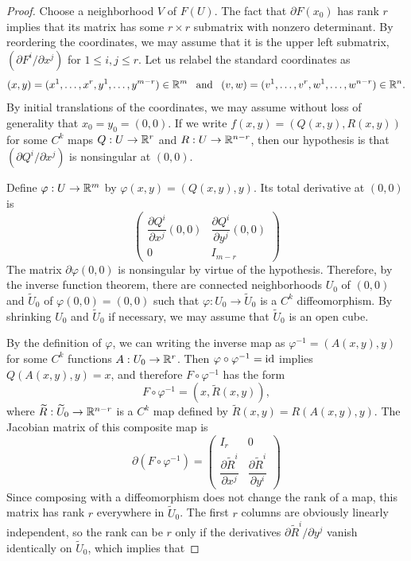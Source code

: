 \begin{proof}
Choose a neighborhood $V$ of $F(U)$. The fact that $\partial F(x_0)$ has rank $r$ implies that its matrix has some $r\times r$ submatrix with nonzero determinant. By reordering the coordinates, we may assume that it is the upper left submatrix, $(\partial F^i/\partial x^j)$ for $1\leq i,j\leq r$. Let us relabel the standard coordinates as 
\[(x,y)=(x^1,\dots,x^r,y^1,\dots,y^{m-r})\in\mathbb{R}^m \hspace{8pt}\text{and}\hspace{8pt}(v,w)=(v^1,\dots,v^r,w^1,\dots,w^{n-r})\in\mathbb{R}^n.\] 
By initial translations of the coordinates, we may assume without loss of generality that $x_0=y_0=(0,0)$. If we write $f(x,y)=(Q(x,y),R(x,y))$ for some $C^k$ maps 
$Q:U\to\mathbb{R}^r$ and $R:U\to\mathbb{R}^{n-r}$, then our hypothesis is that $(\partial Q^i/\partial x^j)$ is nonsingular at $(0,0)$.\par
Define $\varphi:U\to\mathbb{R}^m$ by $\varphi(x,y)=(Q(x,y),y)$. Its total derivative at $(0,0)$ is
\[\begin{pmatrix}
\dfrac{\partial Q^i}{\partial x^j}(0,0)&\dfrac{\partial Q^i}{\partial y^j}(0,0)\\[8pt]
0&I_{m-r}
\end{pmatrix}\]
The matrix $\partial\varphi(0,0)$ is nonsingular by virtue of the hypothesis. Therefore, by the inverse function theorem, there are connected neighborhoods $U_0$ of 
$(0,0)$ and $\widetilde{U}_0$ of $\varphi(0,0)=(0,0)$ such that $\varphi:U_0\to\widetilde{U}_0$ is a $C^k$ diffeomorphism. By shrinking $U_0$ and $\widetilde{U}_0$ if 
necessary, we may assume that $\widetilde{U}_0$ is an open cube.\par
By the definition of $\varphi$, we can writing the inverse map as $\varphi^{-1}=(A(x,y),y)$ for some $C^k$ functions $A:U_0\to\mathbb{R}^r$. Then 
$\varphi\circ\varphi^{-1}=\mathrm{id}$ implies $Q(A(x,y),y)=x$, and therefore $F\circ\varphi^{-1}$ has the form
\[F\circ\varphi^{-1}=(x,\widetilde{R}(x,y)),\]
where $\widetilde{R}:\widetilde{U}_0\to\mathbb{R}^{n-r}$ is a $C^k$ map defined by $\widetilde{R}(x,y)=R(A(x,y),y)$. The Jacobian matrix of this composite map is
\[\partial(F\circ\varphi^{-1})=\begin{pmatrix}
I_r&0\\
\dfrac{\partial\widetilde{R}^i}{\partial x^j}&\dfrac{\partial\widetilde{R}^i}{\partial y^i}
\end{pmatrix}\]
Since composing with a diffeomorphism does not change the rank of a map, this matrix has rank $r$ everywhere in $\widetilde{U}_0$. The first $r$ columns are obviously 
linearly independent, so the rank can be $r$ only if the derivatives $\partial\widetilde{R}^i/\partial y^j$ vanish identically on $\widetilde{U}_0$, which implies that 

\end{proof}
